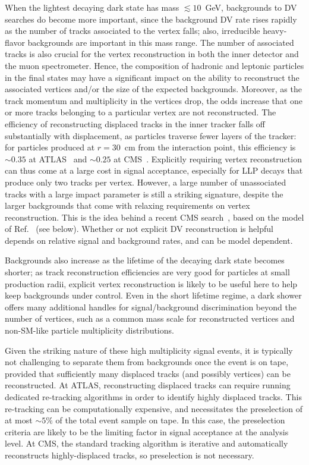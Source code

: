 When the lightest decaying dark state has mass $\lesssim 10$~GeV, backgrounds to DV searches do become more important, since the background DV rate rises rapidly as the number of tracks associated to the vertex falls; also, irreducible heavy-flavor backgrounds are important in this mass range. The number of associated tracks is also crucial for the vertex reconstruction in both the inner detector and the muon spectrometer. Hence, the composition of hadronic and leptonic particles in the final states may have a significant impact on the ability to reconstruct the associated vertices and/or the size of the expected backgrounds. Moreover, as the track momentum and multiplicity in the vertices drop, the odds increase that one or more tracks belonging to a particular vertex are not reconstructed.
The efficiency of reconstructing displaced tracks in the inner tracker falls off substantially with displacement, as particles traverse fewer layers of the tracker: for particles produced at $r=30$~cm from the interaction point, this efficiency is $\sim 0.35$ at ATLAS~\cite{ATL-PHYS-PUB-2017-014} and $\sim 0.25$ at CMS~\cite{Rovere:2134627}. Explicitly requiring vertex reconstruction can thus come at a large cost in signal acceptance, especially for LLP decays that produce only two tracks per vertex. However, a large number of unassociated tracks with a large impact parameter is still a striking signature, despite the larger backgrounds that come with relaxing requirements on vertex reconstruction. This is the idea behind a recent CMS search~\cite{Sirunyan:2018njd}, based on the model of Ref.~\cite{Schwaller:2015gea} (see below). Whether or not explicit DV reconstruction is helpful depends on relative signal and background rates, and can be model dependent.

Backgrounds also increase as the lifetime of the decaying dark state becomes shorter; as track reconstruction efficiencies are very good for particles at small production radii, explicit vertex reconstruction is likely to be useful here to help keep backgrounds under control. Even in the short lifetime regime, a dark shower offers many additional handles for signal/background discrimination beyond the number of vertices, such as a common mass scale for reconstructed vertices and non-SM-like particle multiplicity distributions.

Given the striking nature of these high multiplicity signal events, it is typically not challenging to separate them from backgrounds once the event is on tape, provided that sufficiently many displaced tracks (and possibly vertices) can be reconstructed. At ATLAS, reconstructing displaced tracks can require running dedicated re-tracking algorithms in order to identify highly displaced tracks. This re-tracking can be computationally expensive, and necessitates the preselection of at most $\sim 5\%$ of the total event sample on tape.  %
In this case, the preselection criteria are likely to be the limiting factor in signal acceptance at the analysis level. At CMS, the standard tracking algorithm is iterative and automatically reconstructs highly-displaced tracks, so preselection is not necessary. 

